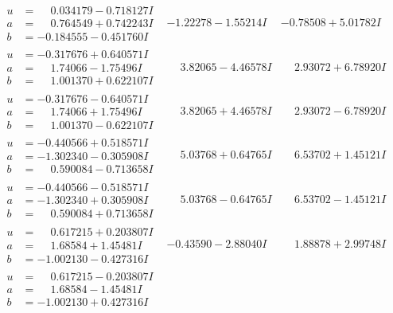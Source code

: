 \documentclass[1p]{elsarticle_modified}
\theoremstyle{definition}
\begin{document}
$$\begin{array}{c|c|c}
\begin{aligned}
u &= \phantom{-}0.034179 - 0.718127 I \\
a &= \phantom{-}0.764549 + 0.742243 I \\
b &= -0.184555 - 0.451760 I\end{aligned}
 & -1.22278 - 1.55214 I & -0.78508 + 5.01782 I \\ \hline\begin{aligned}
u &= -0.317676 + 0.640571 I \\
a &= \phantom{-}1.74066 - 1.75496 I \\
b &= \phantom{-}1.001370 + 0.622107 I\end{aligned}
 & \phantom{-}3.82065 - 4.46578 I & \phantom{-}2.93072 + 6.78920 I \\ \hline\begin{aligned}
u &= -0.317676 - 0.640571 I \\
a &= \phantom{-}1.74066 + 1.75496 I \\
b &= \phantom{-}1.001370 - 0.622107 I\end{aligned}
 & \phantom{-}3.82065 + 4.46578 I & \phantom{-}2.93072 - 6.78920 I \\ \hline\begin{aligned}
u &= -0.440566 + 0.518571 I \\
a &= -1.302340 - 0.305908 I \\
b &= \phantom{-}0.590084 - 0.713658 I\end{aligned}
 & \phantom{-}5.03768 + 0.64765 I & \phantom{-}6.53702 + 1.45121 I \\ \hline\begin{aligned}
u &= -0.440566 - 0.518571 I \\
a &= -1.302340 + 0.305908 I \\
b &= \phantom{-}0.590084 + 0.713658 I\end{aligned}
 & \phantom{-}5.03768 - 0.64765 I & \phantom{-}6.53702 - 1.45121 I \\ \hline\begin{aligned}
u &= \phantom{-}0.617215 + 0.203807 I \\
a &= \phantom{-}1.68584 + 1.45481 I \\
b &= -1.002130 - 0.427316 I\end{aligned}
 & -0.43590 - 2.88040 I & \phantom{-}1.88878 + 2.99748 I \\ \hline\begin{aligned}
u &= \phantom{-}0.617215 - 0.203807 I \\
a &= \phantom{-}1.68584 - 1.45481 I \\
b &= -1.002130 + 0.427316 I\end{aligned}

\end{array}$$
\end{document}
